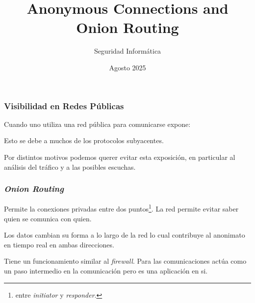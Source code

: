 \documentclass{beamer}
\title[Onion Routing] %
{Anonymous Connections and Onion Routing}
\subtitle{
}
\author[] %
{
    Seguridad Informática 
}
\institute[LCC - FCEIA] %
{
    Facultad de Ciencias Exactas, Ingeniería y Agrimensura\\Universidad Nacional de Rosario
}
\date[Seguridad Informática] %
{Agosto 2025}
\newcommand { \onion } {\textit{Onion Routing}\xspace}
\newcommand{\vspc}{\vspace{0.5cm}}
\begin{document}
\frame{
    \titlepage
}

\begin{frame}
    \frametitle{Visibilidad en Redes Públicas}
    Cuando uno utiliza una red pública para comunicarse expone:
    \begin{itemize}
    \end{itemize}

    Esto se debe a muchos de los protocolos subyacentes.

    \pause

    Por distintos motivos podemos querer evitar esta exposición, en particular al análisis del tráfico y a las posibles escuchas.

\end{frame}

\begin{frame}
    \frametitle{\onion}

    Permite la conexiones privadas entre dos puntos\footnote{entre \textit{initiator} y \textit{responder}.}. La red permite evitar saber quien se comunica con quien.

    \vspc

    Los datos cambian su forma a lo largo de la red lo cual contribuye al anonimato en tiempo real en ambas direcciones.

    \vspc

    Tiene un funcionamiento similar al \textit{firewall}. Para las comunicaciones actúa como un paso intermedio en la comunicación pero es una aplicación en si.
\end{frame}
\end{document}
